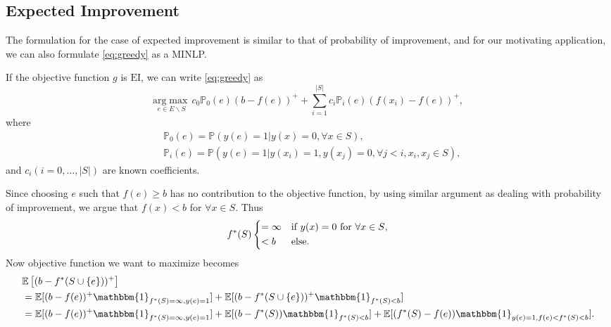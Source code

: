 \documentclass[opre,nonblindrev]{informs3} %
\newcommand{\E}{\mathbb{E}}
\newcommand{\EI}{\mathrm{EI}}
\begin{document}
\subsection{Expected Improvement}
The formulation for the case of expected improvement is similar to that of probability of improvement, and for our motivating application, we can also formulate \eqref{eq:greedy} as a MINLP.
\begin{proposition}
  If the objective function $g$ is $\EI$, we can write \eqref{eq:greedy} as 
  \begin{equation} \label{eq:EI1}
    \underset{e \in E \backslash S}{\mathrm{arg}\max} \, c_0 \mathbb{P}_0(e)(b-f(e))^+ + \sum_{i=1}^{|S|} c_i \mathbb{P}_i(e)(f(x_i)-f(e))^+,
  \end{equation}
  where
  \begin{equation*}
    \begin{split}
      &\mathbb{P}_0(e)=\mathbb{P}(y(e)=1|y(x)=0, \forall x \in S), \\
      &\mathbb{P}_i(e)=\mathbb{P}(y(e)=1|y(x_i)=1, y(x_j)=0, \forall j<i, x_i,x_j \in S),
    \end{split}
  \end{equation*}
  and $c_i (i=0,\ldots,|S|)$ are known coefficients.
\end{proposition}
Since choosing $e$ such that $f(e) \geq b$ has no contribution to the objective function, by using similar argument as dealing with probability of improvement, we argue that $f(x)<b$ for $\forall x \in S$. Thus
\begin{equation*}
f^*(S)  \begin{dcases}
         =\infty & \text{if $y(x)=0$ for $\forall x \in S$},\\
         < b & \text{else}.
 \end{dcases}
\end{equation*}
Now objective function we want to maximize becomes
\begin{equation*}
  \begin{split}
    &\E \left[ (b-f^*(S \cup \{e\}))^+ \right] \\
    &= \E[(b-f(e))^+ \mathbbm{1}_{f^*(S)=\infty, y(e)=1}]+ \E[ (b-f^*(S \cup \{e\}))^+ \mathbbm{1}_{f^*(S)<b}] \\
    &= \E[(b-f(e))^+ \mathbbm{1}_{f^*(S)=\infty, y(e)=1}]+ \E[ (b-f^*(S)) \mathbbm{1}_{f^*(S)<b}] + \E[(f^*(S)-f(e)) \mathbbm{1}_{y(e)=1, f(e)<f^*(S)<b}].
  \end{split}
\end{equation*}
\end{document}
